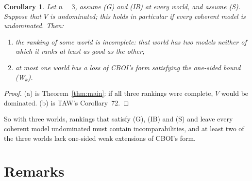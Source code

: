 \documentclass[11pt]{article}
\newtheorem{corollary}[theorem]{Corollary}
\theoremstyle{definition}\newtheorem{definition}[theorem]{Definition}
\theoremstyle{remark}\newtheorem{remark}[theorem]{Remark}
\begin{document}
\begin{corollary}\label{cor:coverage}
Let $n=3$, assume (G) and (IB) at every world, and assume (S). Suppose that
$V$ is undominated; this holds in particular if every coherent model is
undominated. Then:
\begin{enumerate}[label=(\alph*),leftmargin=*,itemsep=2pt]
\item the ranking of some world is incomplete: that world has two models
neither of which it ranks at least as good as the other;
\item at most one world has a loss of CBOI's form satisfying the one-sided
bound (W$_k$).
\end{enumerate}
\end{corollary}
\begin{proof}
(a) is Theorem~\ref{thm:main}: if all three rankings were complete, $V$
would be dominated. (b) is TAW's Corollary~72.
\end{proof}

So with three worlds, rankings that satisfy (G), (IB) and (S) and leave
every coherent model undominated must contain incomparabilities, and at
least two of the three worlds lack one-sided weak extensions of CBOI's
form.

\section{Remarks}\label{sec:remarks}
\end{document}
